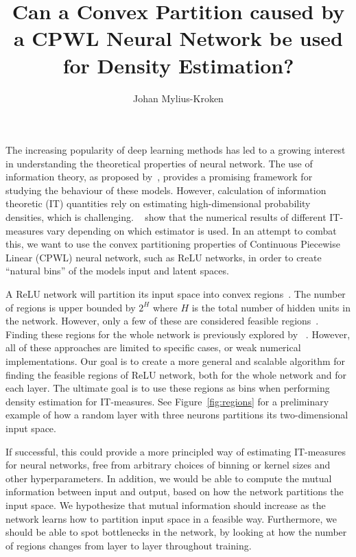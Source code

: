 \documentclass{article} %
\title{Can a Convex Partition caused by a CPWL Neural Network be used for Density Estimation?}
\author{Johan Mylius-Kroken}
\begin{document}
\maketitle

The increasing popularity of deep learning methods has led to a growing interest in understanding the theoretical properties of neural network. The use of information theory, as proposed by~\cite{tishbyDeepLearningInformation2015a,shwartz-zivOpeningBlackBox2017}, provides a promising framework for studying the behaviour of these models. However, calculation of information theoretic (IT) quantities rely on estimating high-dimensional probability densities, which is challenging. ~\cite{geigerInformationPlaneAnalyses2022} show that the numerical results of different IT-measures vary depending on which estimator is used. In an attempt to combat this, we want to use the convex partitioning properties of Continuous Piecewise Linear (CPWL) neural network, such as ReLU networks, in order to create ``natural bins'' of the models input and latent spaces. 

A ReLU network will partition its input space into convex regions~\citep{serraBoundingCountingLinear2018,haninComplexityLinearRegions2019}. The number of regions is upper bounded by $2^H$ where $H$ is the total number of hidden units in the network. However, only a few of these are considered feasible regions~\cite{haninDeepReLUNetworks2019}. Finding these regions for the whole network is previously explored by ~\cite{liuReLUNeuralNetworks2023,sattelbergLocallyLinearAttributes2023,humayunSplineCamExactVisualization2024}. However, all of these approaches are limited to specific cases, or weak numerical implementations. Our goal is to create a more general and scalable algorithm for finding the feasible regions of ReLU network, both for the whole network and for each layer. The ultimate goal is to use these regions as bins when performing density estimation for IT-measures. See Figure~\ref{fig:regions} for a preliminary example of how a random layer with three neurons partitions its two-dimensional input space.

If successful, this could provide a more principled way of estimating IT-measures for neural networks, free from arbitrary choices of binning or kernel sizes and other hyperparameters. In addition, we would be able to compute the mutual information between input and output, based on how the network partitions the input space. We hypothesize that mutual information should increase as the network learns how to partition input space in a feasible way. Furthermore, we should be able to spot bottlenecks in the network, by looking at how the number of regions changes from layer to layer throughout training.
\end{document}

